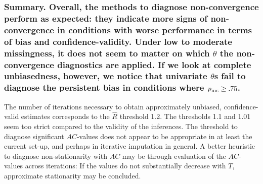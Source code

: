 \documentclass[Royal,times,sageh]{sagej}
\begin{document}
\hypertarget{summary.-overall-the-methods-to-diagnose-non-convergence-perform-as-expected-they-indicate-more-signs-of-non-convergence-in-conditions-with-worse-performance-in-terms-of-bias-and-confidence-validity.-under-low-to-moderate-missingness-it-does-not-seem-to-matter-on-which-theta-the-non-convergence-diagnostics-are-applied.-if-we-look-at-complete-unbiasedness-however-we-notice-that-univariate-thetas-fail-to-diagnose-the-persistent-bias-in-conditions-where-p_rm-incgeq.75.}{%
\subsubsection{\texorpdfstring{Summary. Overall, the methods to diagnose non-convergence perform as expected: they indicate more signs of non-convergence in conditions with worse performance in terms of bias and confidence-validity. Under low to moderate missingness, it does not seem to matter on which \(\theta\) the non-convergence diagnostics are applied. If we look at complete unbiasedness, however, we notice that univariate \(\theta\)s fail to diagnose the persistent bias in conditions where \(p_{\rm inc}\geq.75\).}{Summary. Overall, the methods to diagnose non-convergence perform as expected: they indicate more signs of non-convergence in conditions with worse performance in terms of bias and confidence-validity. Under low to moderate missingness, it does not seem to matter on which \textbackslash theta the non-convergence diagnostics are applied. If we look at complete unbiasedness, however, we notice that univariate \textbackslash thetas fail to diagnose the persistent bias in conditions where p\_\{\textbackslash rm inc\}\textbackslash geq.75.}}\label{summary.-overall-the-methods-to-diagnose-non-convergence-perform-as-expected-they-indicate-more-signs-of-non-convergence-in-conditions-with-worse-performance-in-terms-of-bias-and-confidence-validity.-under-low-to-moderate-missingness-it-does-not-seem-to-matter-on-which-theta-the-non-convergence-diagnostics-are-applied.-if-we-look-at-complete-unbiasedness-however-we-notice-that-univariate-thetas-fail-to-diagnose-the-persistent-bias-in-conditions-where-p_rm-incgeq.75.}}

The number of iterations necessary to obtain approximately unbiased, confidence-valid estimates corresponds to the \(\widehat{R}\) threshold 1.2. The thresholds 1.1 and 1.01 seem too strict compared to the validity of the inferences. The threshold to diagnose significant \(AC\)-values does not appear to be appropriate in at least the current set-up, and perhaps in iterative imputation in general. A better heuristic to diagnose non-stationarity with \(AC\) may be through evaluation of the \(AC\)-values across iterations: If the values do not substantially decrease with \(T\), approximate stationarity may be concluded.
\end{document}
